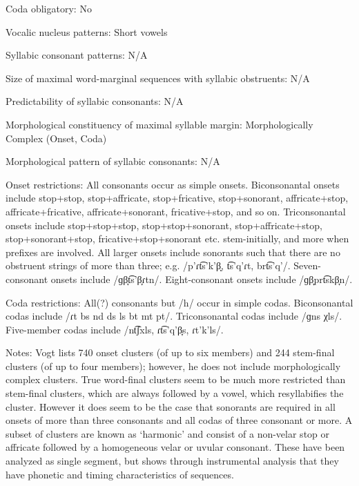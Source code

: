 {\begin{appendixdesc}
\item[Coda obligatory:] No

\item[Vocalic nucleus patterns:] Short vowels

\item[Syllabic consonant patterns:] N/A

\item[Size of maximal word-marginal sequences with syllabic obstruents:] N/A

\item[Predictability of syllabic consonants:] N/A

\item[Morphological constituency of maximal syllable margin:] Morphologically Complex (Onset, Coda)

\item[Morphological pattern of syllabic consonants:] N/A

\item[Onset restrictions:] All consonants occur as simple onsets. Biconsonantal onsets include stop+stop, stop+affricate, stop+fricative, stop+sonorant, affricate+stop, affricate+fricative, affricate+sonorant, fricative+stop, and so on. Triconsonantal onsets include stop+stop+stop, stop+stop+sonorant, stop+affricate+stop, stop+sonorant+stop, fricative+stop+sonorant etc. stem-initially, and more when prefixes are involved. All larger onsets include sonorants such that there are no obstruent strings of more than three; e.g. /p’ɾt͡s’k'β̞, t͡s’q’ɾt, brt͡s'q{}'/. Seven-consonant onsets include /ɡβ̞t͡s’β̞ɾtn/. Eight-consonant onsets include /ɡβ̞prt͡skβ̞n/.

\item[Coda restrictions:] All(?) consonants but /h/ occur in simple codas. Biconsonantal codas include /ɾt bs nd ds ls bt mt pt/. Triconsonantal codas include /ɡns χls/. Five-member codas include /nt͡ʃxls, ɾt͡s’q’β̞s, ɾt'k'ls/.

\item[Notes:] Vogt lists 740 onset clusters (of up to six members) and 244 stem-final clusters (of up to four members); however, he does not include morphologically complex clusters. True word-final clusters seem to be much more restricted than stem-final clusters, which are always followed by a vowel, which resyllabifies the cluster. However it does seem to be the case that sonorants are required in all onsets of more than three consonants and all codas of three consonant or more. A subset of clusters are known as ‘harmonic’ and consist of a non-velar stop or affricate followed by a homogeneous velar or uvular consonant. These have been analyzed as single segment, but \citet{Chitoran1998} shows through instrumental analysis that they have phonetic and timing characteristics of sequences.
\end{appendixdesc}
}
